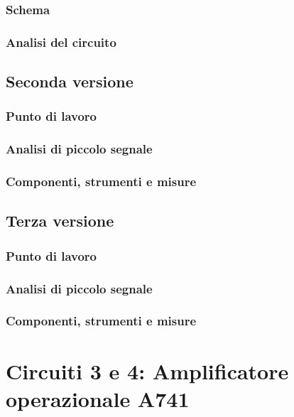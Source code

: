 \documentclass{report}
\begin{document}
\subsection{Schema} %
\subsection{Analisi del circuito} 
\section{Seconda versione} %
\subsection{Punto di lavoro} 
\subsection{Analisi di piccolo segnale} 
\subsection{Componenti, strumenti e misure} 
\section{Terza versione} %
\subsection{Punto di lavoro} 
\subsection{Analisi di piccolo segnale}  
\subsection{Componenti, strumenti e misure} 


\clearpage
\newpage
\chapter{Circuiti 3 e 4: Amplificatore operazionale \textmu A741}
\end{document}
